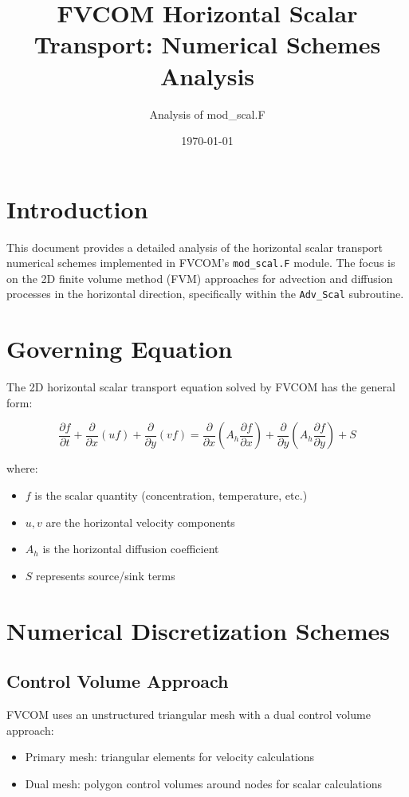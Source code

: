 \documentclass[11pt,a4paper]{article}
\title{FVCOM Horizontal Scalar Transport: Numerical Schemes Analysis}
\author{Analysis of mod\_scal.F}
\date{\today}
\begin{document}
\maketitle

\section{Introduction}

This document provides a detailed analysis of the horizontal scalar transport numerical schemes implemented in FVCOM's \texttt{mod\_scal.F} module. The focus is on the 2D finite volume method (FVM) approaches for advection and diffusion processes in the horizontal direction, specifically within the \texttt{Adv\_Scal} subroutine.

\section{Governing Equation}

The 2D horizontal scalar transport equation solved by FVCOM has the general form:

\begin{equation}
\frac{\partial f}{\partial t} + \frac{\partial}{\partial x}(uf) + \frac{\partial}{\partial y}(vf) = \frac{\partial}{\partial x}\left(A_h \frac{\partial f}{\partial x}\right) + \frac{\partial}{\partial y}\left(A_h \frac{\partial f}{\partial y}\right) + S
\end{equation}

where:
\begin{itemize}
\item $f$ is the scalar quantity (concentration, temperature, etc.)
\item $u, v$ are the horizontal velocity components
\item $A_h$ is the horizontal diffusion coefficient
\item $S$ represents source/sink terms
\end{itemize}

\section{Numerical Discretization Schemes}

\subsection{Control Volume Approach}

FVCOM uses an unstructured triangular mesh with a dual control volume approach:
\begin{itemize}
\item Primary mesh: triangular elements for velocity calculations
\item Dual mesh: polygon control volumes around nodes for scalar calculations
\end{itemize}
\end{document}
